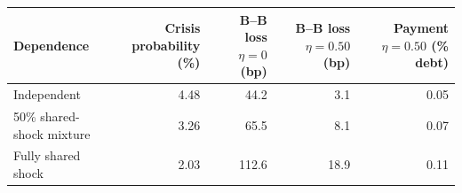 \begin{tabular*}{\textwidth}{@{\extracolsep{\fill}}lrrrr@{}}
\toprule
Dependence & \shortstack{Crisis probability\\(\%)} & \shortstack{B--B loss\\$\eta=0$ (bp)} & \shortstack{B--B loss\\$\eta=0.50$ (bp)} & \shortstack{Payment\\$\eta=0.50$ (\% debt)} \\
\midrule
Independent & 4.48 & 44.2 & 3.1 & 0.05 \\
50\% shared-shock mixture & 3.26 & 65.5 & 8.1 & 0.07 \\
Fully shared shock & 2.03 & 112.6 & 18.9 & 0.11 \\
\bottomrule
\end{tabular*}
